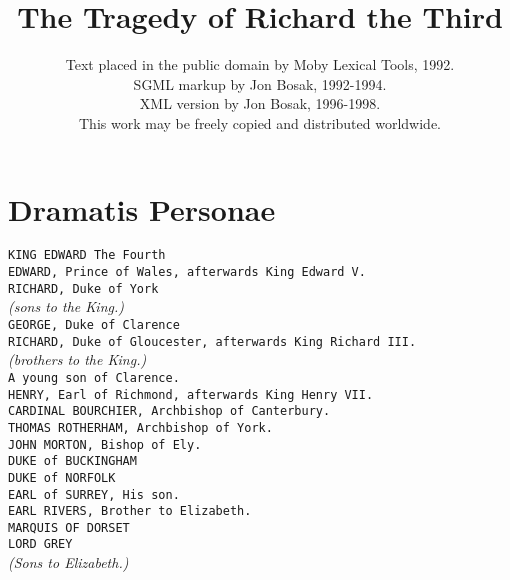 \documentclass{article}
\begin{document}
\parindent 0pt
\title{The Tragedy of Richard the Third}
\author{
Text placed in the public domain by Moby Lexical Tools, 1992.\\
SGML markup by Jon Bosak, 1992-1994.\\
XML version by Jon Bosak, 1996-1998.\\
This work may be freely copied and distributed worldwide.\\
}
\maketitle{}
\newpage
\section*{Dramatis Personae}
{\tt KING EDWARD The Fourth}\\

{\tt EDWARD, Prince of Wales, afterwards King Edward V.}\\
{\tt RICHARD, Duke of York }\\
{\it (sons to the King.)}\\

{\tt GEORGE, Duke of Clarence}\\
{\tt RICHARD, Duke of Gloucester, afterwards King Richard III.}\\
{\it (brothers to the King.)}\\

{\tt A young son of Clarence. }\\

{\tt HENRY, Earl of Richmond, afterwards King Henry VII.}\\

{\tt CARDINAL BOURCHIER, Archbishop of Canterbury. }\\

{\tt THOMAS ROTHERHAM, Archbishop of York. }\\

{\tt JOHN MORTON, Bishop of Ely. }\\

{\tt DUKE of BUCKINGHAM}\\

{\tt DUKE of NORFOLK}\\

{\tt EARL of SURREY, His son. }\\

{\tt EARL RIVERS, Brother to Elizabeth. }\\

{\tt MARQUIS OF DORSET}\\
{\tt LORD GREY}\\
{\it (Sons to Elizabeth.)}\\
\end{document}
